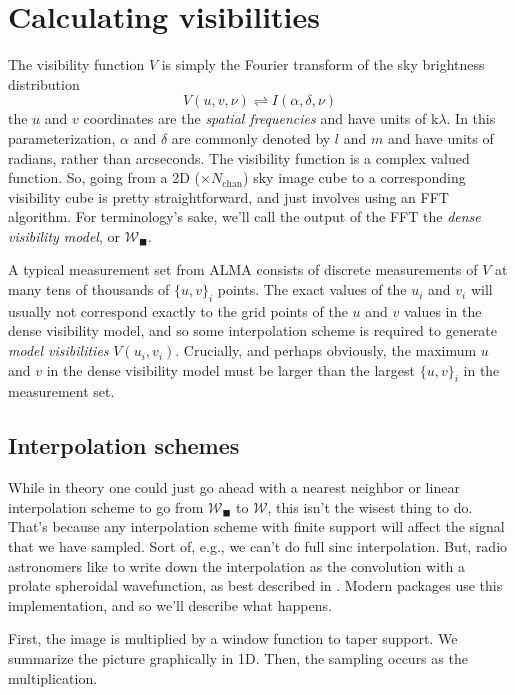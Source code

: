 \documentclass[modern]{aastex62}
\newcommand{\vm}{\boldsymbol{\mathcal{W}}} %
\begin{document}
\section{Calculating visibilities}
The visibility function $V$ is simply the Fourier transform of the sky brightness distribution
\begin{equation}
  V(u, v, \nu) \rightleftharpoons I(\alpha, \delta, \nu)
\end{equation}
the $u$ and $v$ coordinates are the \emph{spatial frequencies} and have units of k$\lambda$. In this parameterization, $\alpha$ and $\delta$ are commonly denoted by $l$ and $m$ and have units of radians, rather than arcseconds. The visibility function is a complex valued function. So, going from a 2D ($\times N_\mathrm{chan}$) sky image cube to a corresponding visibility cube is pretty straightforward, and just involves using an FFT algorithm. For terminology's sake, we'll call the output of the FFT the \emph{dense visibility model}, or $\vm_\blacksquare$.

A typical measurement set from ALMA consists of discrete measurements of $V$ at many tens of thousands of $\{ u, v\}_i$ points. The exact values of the $u_i$ and $v_i$ will usually not correspond exactly to the grid points of the $u$ and $v$ values in the dense visibility model, and so some interpolation scheme is required to generate \emph{model visibilities} $V(u_i, v_i)$. Crucially, and perhaps obviously, the maximum $u$ and $v$ in the dense visibility model must be larger than the largest $\{ u, v\}_i$ in the measurement set.

\subsection{Interpolation schemes}
While in theory one could just go ahead with a nearest neighbor or linear interpolation scheme to go from $\vm_\blacksquare$ to $\vm$, this isn't the wisest thing to do. That's because any interpolation scheme with finite support will affect the signal that we have sampled. Sort of, e.g., we can't do full sinc interpolation. But, radio astronomers like to write down the interpolation as the convolution with a prolate spheroidal wavefunction, as best described in \citep{schwab84}. Modern packages use this implementation, and so we'll describe what happens.

First, the image is multiplied by a window function to taper support. We summarize the picture graphically in 1D. Then, the sampling occurs as the multiplication.
\end{document}

